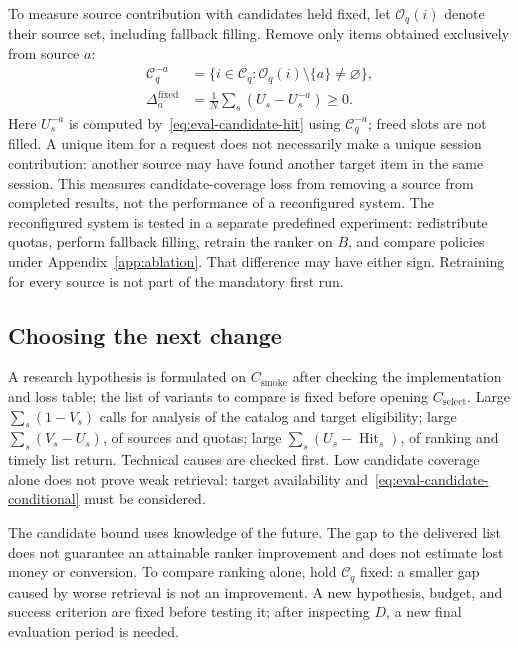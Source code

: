 \documentclass[12pt,a4paper]{article}
\theoremstyle{plainru}
\begin{document}
To measure source contribution with candidates held fixed, let
$\mathcal O_q(i)$ denote their source set, including fallback filling.
Remove only items obtained exclusively from source $a$:
\begin{align}\label{eq:eval-source-removal}
\mathcal C_q^{-a}
&=\{i\in\mathcal C_q:\mathcal O_q(i)\setminus\{a\}\ne\varnothing\},\\
\Delta_a^{\mathrm{fixed}}
&=\frac1N\sum_s(U_s-U_s^{-a})\ge0.
\nonumber
\end{align}
Here $U_s^{-a}$ is computed by~\eqref{eq:eval-candidate-hit}
using $\mathcal C_q^{-a}$; freed slots are not filled.
A unique item for a request does not necessarily make a unique session contribution:
another source may have found another target item in the same session.
This measures candidate-coverage loss from removing a source from completed
results, not the performance of a reconfigured system.
The reconfigured system is tested in a separate predefined experiment:
redistribute quotas, perform fallback filling, retrain
the ranker on $B$, and compare policies under Appendix~\ref{app:ablation}.
That difference may have either sign. Retraining for every
source is not part of the mandatory first run.

\subsection{Choosing the next change}
\label{sec:eval-next-step}

A research hypothesis is formulated on $C_{\mathrm{smoke}}$ after
checking the implementation and loss table; the list of variants to compare
is fixed before opening $C_{\mathrm{select}}$.
Large $\sum_s(1-V_s)$ calls for analysis of the catalog and target eligibility;
large $\sum_s(V_s-U_s)$, of sources and quotas;
large $\sum_s(U_s-\operatorname{Hit}_s)$, of ranking
and timely list return. Technical causes are checked first.
Low candidate coverage alone does not prove weak retrieval:
target availability and~\eqref{eq:eval-candidate-conditional} must be considered.

The candidate bound uses knowledge of the future. The gap to the delivered list
does not guarantee an attainable ranker improvement and does not estimate
lost money or conversion. To compare ranking alone, hold
$\mathcal C_q$ fixed: a smaller gap caused by worse retrieval
is not an improvement. A new hypothesis, budget, and success criterion
are fixed before testing it; after inspecting $D$, a new final evaluation period is needed.
\end{document}
